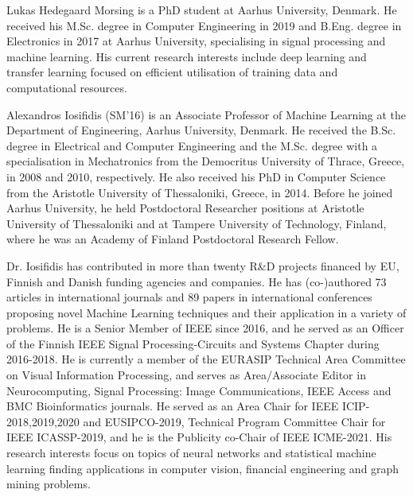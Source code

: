 
\begin{IEEEbiography}{Lukas Hedegaard Morsing}
is a PhD student at Aarhus University, Denmark. He received his M.Sc. degree in Computer Engineering in 2019 and B.Eng. degree in Electronics in 2017 at Aarhus University, specialising in signal processing and machine learning. His current research interests include deep learning and transfer learning focused on efficient utilisation of training data and computational resources.
\end{IEEEbiography}


\begin{IEEEbiography}{Alexandros Iosifidis} (SM'16) is an Associate Professor of Machine Learning at the Department of Engineering, Aarhus University, Denmark. He received the B.Sc. degree in Electrical and Computer Engineering and the M.Sc. degree with a specialisation in Mechatronics from the Democritus University of Thrace, Greece, in 2008 and 2010, respectively. He also received his PhD in Computer Science from the Aristotle University of Thessaloniki, Greece, in 2014. Before he joined Aarhus University, he held Postdoctoral Researcher positions at Aristotle University of Thessaloniki and at Tampere University of Technology, Finland, where he was an Academy of Finland Postdoctoral Research Fellow. 

Dr. Iosifidis has contributed in more than twenty R\&D projects financed by EU, Finnish and Danish funding agencies and companies. He has (co-)authored 73 articles in international journals and 89 papers in international conferences proposing novel Machine Learning techniques and their application in a variety of problems. He is a Senior Member of IEEE since 2016, and he served as an Officer of the Finnish IEEE Signal Processing-Circuits and Systems Chapter during 2016-2018. He is currently a member of the EURASIP Technical Area Committee on Visual Information Processing, and serves as Area/Associate Editor in Neurocomputing, Signal Processing: Image Communications, IEEE Access and BMC Bioinformatics journals. He served as an Area Chair for IEEE ICIP-2018,2019,2020 and EUSIPCO-2019, Technical Program Committee Chair for IEEE ICASSP-2019, and he is the Publicity co-Chair of IEEE ICME-2021. His research interests focus on topics of neural networks and statistical machine learning finding applications in computer vision, financial engineering and graph mining problems.
\end{IEEEbiography}